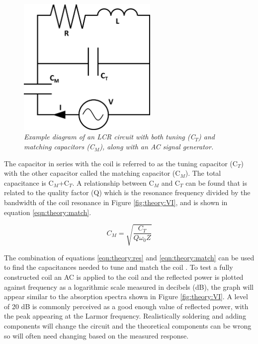 \begin{figure}
    \centering
    \includegraphics[width=0.6\textwidth]{Figures/Theory/RLC_Circuit.png}
    \caption{\textit{Example diagram of an LCR circuit with both tuning (C$_T$) and matching capacitors (C$_M$), along with an AC signal generator.}}
    \label{fig:theory:RLC}
\end{figure}

The capacitor in series with the coil is referred to as the tuning capacitor (C$_T$) with the other capacitor called the matching capacitor (C$_M$). The total capacitance is C$_M$+C$_T$. A relationship between C$_M$ and C$_T$ can be found that is related to the quality factor (Q) \cite{Chen1989ChapterNoise} which is the resonance frequency divided by the bandwidth of the coil resonance in Figure \ref{fig:theory:VI}, and is shown in equation \ref{eqn:theory:match}. 

\begin{equation}
    C_M = \sqrt{\frac{C_T}{Q\omega_0Z}}
    \label{eqn:theory:match}
\end{equation}

The combination of equations \ref{eqn:theory:res} and \ref{eqn:theory:match} can be used to find the capacitances needed to tune and match the coil \cite{Chen1989ChapterNoise}. To test a fully constructed coil an \ac{AC} is applied to the coil and the reflected power is plotted against frequency as a logarithmic scale measured in decibels (dB), the graph will appear similar to the absorption spectra shown in Figure \ref{fig:theory:VI}. A level of 20 dB is commonly perceived as a good enough value of reflected power, with the peak appearing at the Larmor frequency. Realistically soldering and adding components will change the circuit and the theoretical components can be wrong so will often need changing based on the measured response.

